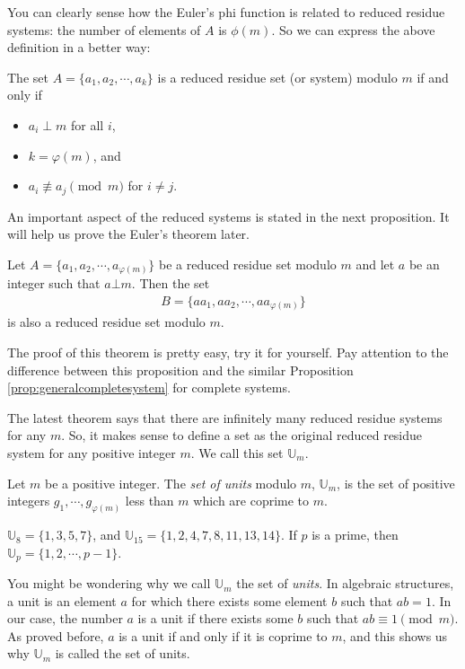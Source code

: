 \documentclass{subfile}
\begin{document}
	You can clearly sense how the Euler's phi function is related to reduced residue systems: the number of elements of $A$ is $\phi(m)$. So we can express the above definition in a better way:
	
	
	\begin{proposition}
		The set $A=\{a_1, a_2, \cdots, a_k\}$ is a reduced residue set (or system) modulo $m$ if and only if
		\begin{itemize}
			\item $a_i \perp m$ for all $i$,
			\item $k=\varphi(m)$, and
			\item $a_i \not \equiv a_j \pmod m$ for $i \neq j$.
		\end{itemize}
	\end{proposition}
	
	An important aspect of the reduced systems is stated in the next proposition. It will help us prove the Euler's theorem later.	
	
	\begin{proposition}\label{prop:generalreducedsystem} 
		Let $A=\{a_1, a_2, \cdots, a_{\varphi(m)}\}$ be a reduced residue set modulo $m$ and let $a$ be an integer such that $a \bot m$. Then the set
		\begin{align*}
			B=\{aa_1, aa_2, \cdots, aa_{\varphi(m)}\}
		\end{align*}
		is also a reduced residue set modulo $m$.
	\end{proposition}
	
	The proof of this theorem is pretty easy, try it for yourself. Pay attention to the difference between this proposition and the similar Proposition \ref{prop:generalcompletesystem} for complete systems. 
	

	The latest theorem says that there are infinitely many reduced residue systems for any $m$. So, it makes sense to define a set as the original reduced residue system for any positive integer $m$. We call this set $\mathbb U_m$.
	
	\begin{definition}\label{def:setofunits}
		Let $m$ be a positive integer. The \textit{set of units} modulo $m$, $\mathbb U_m$, is the set of positive integers $g_1,\cdots,g_{\varphi(m)}$ less than $m$ which are coprime to $m$. 
	\end{definition}
	
	\begin{example}
		$\mathbb U_8=\{1,3,5,7\}$, and $\mathbb U_{15}=\{1,2,4,7,8,11,13,14\}$. If $p$ is a prime, then $\mathbb U_p=\{1,2,\cdots, p-1\}$.
	\end{example}

	
	You might be wondering why we call $\mathbb U_m$ the set of \textit{units}. In algebraic structures, a unit is an element $a$ for which there exists some element $b$ such that $ab=1$. In our case, the number $a$ is a unit if there exists some $b$ such that $ab \equiv 1 \pmod m$. As proved before, $a$ is a unit if and only if it is coprime to $m$, and this shows us why $\mathbb U_m$ is called the set of units.
	
\end{document}
